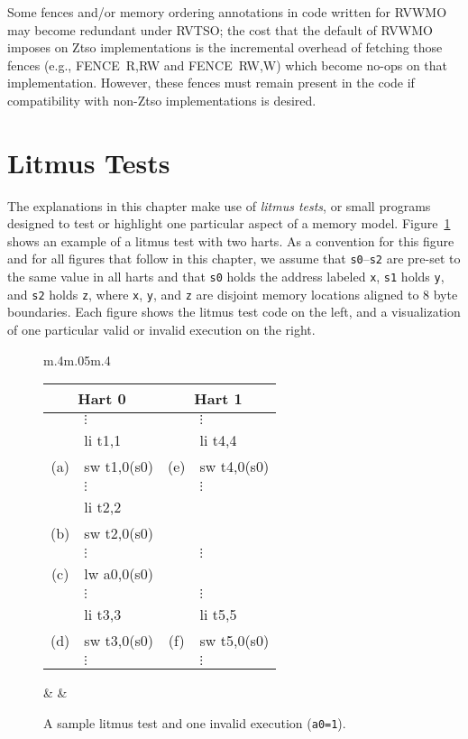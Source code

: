 Some fences and/or memory ordering annotations in code written for RVWMO may become redundant under RVTSO; the cost that the default of RVWMO imposes on Ztso implementations is the incremental overhead of fetching those fences (e.g., FENCE~R,RW and FENCE~RW,W) which become no-ops on that implementation.
However, these fences must remain present in the code if compatibility with non-Ztso implementations is desired.

\section{Litmus Tests}
The explanations in this chapter make use of {\em litmus tests}, or small programs designed to test or highlight one particular aspect of a memory model.
Figure~\ref{fig:litmus:sample} shows an example of a litmus test with two harts.
As a convention for this figure and for all figures that follow in this chapter, we assume that {\tt s0}--{\tt s2} are pre-set to the same value in all harts and that {\tt s0} holds the address labeled {\tt x}, {\tt s1} holds {\tt y}, and {\tt s2} holds {\tt z}, where {\tt x}, {\tt y}, and {\tt z} are disjoint memory locations aligned to 8 byte boundaries.
Each figure shows the litmus test code on the left, and a visualization of one particular valid or invalid execution on the right.

\begin{figure}[h!]
  \centering
    \begin{tabular}{m{.4\linewidth}m{.05\linewidth}m{.4\linewidth}}
    \tt\small
    \begin{tabular}{cl||cl}
    \multicolumn{2}{c}{Hart 0} & \multicolumn{2}{c}{Hart 1} \\
    \hline
          & $\vdots$    &     & $\vdots$    \\
          & li t1,1     &     & li t4,4     \\
      (a) & sw t1,0(s0) & (e) & sw t4,0(s0) \\
          & $\vdots$    &     & $\vdots$    \\
          & li t2,2     &     &             \\
      (b) & sw t2,0(s0) &     &             \\
          & $\vdots$    &     & $\vdots$    \\
      (c) & lw a0,0(s0) &     &             \\
          & $\vdots$    &     & $\vdots$    \\
          & li t3,3     &     & li t5,5     \\
      (d) & sw t3,0(s0) & (f) & sw t5,0(s0) \\
          & $\vdots$    &     & $\vdots$    \\
    \end{tabular}
    & &
    
\end{tabular}
    \caption{A sample litmus test and one invalid execution ({\tt a0=1}).}
  \label{fig:litmus:sample}
\end{figure}


